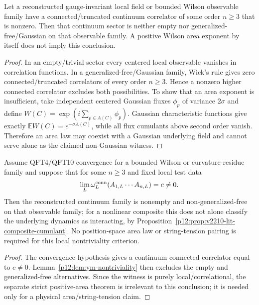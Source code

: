 \documentclass[12pt,a4paper]{article}
\begin{document}
\begin{lemma}
\label{p12:lem:ym-nontriviality}
Let a reconstructed gauge-invariant local field or bounded Wilson observable family have a connected/truncated continuum correlator of some order \(n\ge3\) that is nonzero.  Then that continuum sector is neither empty nor generalized-free/Gaussian on that observable family.  A positive Wilson area exponent by itself does not imply this conclusion.
\end{lemma}
\begin{proof}
In an empty/trivial sector every centered local observable vanishes in correlation functions.  In a generalized-free/Gaussian family, Wick's rule gives zero connected/truncated correlators of every order \(n\ge3\).  Hence a nonzero higher connected correlator excludes both possibilities.  To show that an area exponent is insufficient, take independent centered Gaussian fluxes \(\phi_p\) of variance \(2\sigma\) and define \(W(C)=\exp(i\sum_{p\in A(C)}\phi_p)\).  Gaussian characteristic functions give exactly \(\mathbb E W(C)=e^{-\sigma A(C)}\), while all flux cumulants above second order vanish.  Therefore an area law may coexist with a Gaussian underlying field and cannot serve alone as the claimed non-Gaussian witness.
\end{proof}

\begin{corollary}
\label{p12:cor:wilson-algebra-nontriviality}
Assume QFT4/QFT10 convergence for a bounded Wilson or curvature-residue family and suppose that for some \(n\ge3\) and fixed local test data
\[
\lim_L\omega_L^{\rm conn}(A_{1,L}\cdots A_{n,L})=c\ne0.
\]
Then the reconstructed continuum family is nonempty and non-generalized-free on that observable family; for a nonlinear composite this does not alone classify the underlying dynamics as interacting, by Proposition~\ref{p12:prop:v2210-lit-composite-cumulant}. No position-space area law or string-tension pairing is required for this local nontriviality criterion.
\end{corollary}
\begin{proof}
The convergence hypothesis gives a continuum connected correlator equal to \(c\ne0\).  Lemma~\ref{p12:lem:ym-nontriviality} then excludes the empty and generalized-free alternatives.  Since the witness is purely local/correlational, the separate strict positive-area theorem is irrelevant to this conclusion; it is needed only for a physical area/string-tension claim.
\end{proof}
\end{document}
